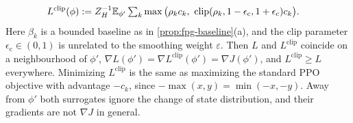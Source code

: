 \begin{proposition}
\begin{enumerate}[nosep,label=(\alph*)]
\begin{align*}
  L^{\mathrm{clip}}(\phi)&:=Z_H^{-1}\E_{\phi'}\textstyle\sum_k\max\big(\rho_kc_k,\ \mathrm{clip}(\rho_k,1-\epsilon_{\mathrm c},1+\epsilon_{\mathrm c})c_k\big).
  \end{align*}
  Here $\beta_k$ is a bounded baseline as in \cref{prop:fpg-baseline}(a), and the clip parameter $\epsilon_{\mathrm c}\in(0,1)$ is unrelated to the smoothing weight $\varepsilon$.
  Then $L$ and $L^{\mathrm{clip}}$ coincide on a neighbourhood of $\phi'$, $\nabla L(\phi')=\nabla L^{\mathrm{clip}}(\phi')=\nabla J(\phi')$, and $L^{\mathrm{clip}}\ge L$ everywhere.
  Minimizing $L^{\mathrm{clip}}$ is the same as maximizing the standard PPO objective with advantage $-c_k$, since $-\max(x,y)=\min(-x,-y)$.
  Away from $\phi'$ both surrogates ignore the change of state distribution, and their gradients are not $\nabla J$ in general.
\end{enumerate}
\end{proposition}
